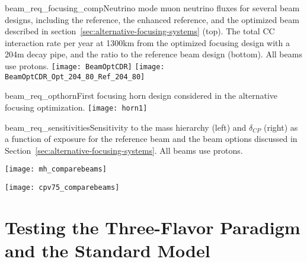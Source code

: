 \begin{cdrfigure}
{beam_req_focusing_comp}{Neutrino mode muon 
    neutrino fluxes for several beam designs, including the 
    reference, the enhanced reference, and the optimized beam
    described in section~\ref{sec:alternative-focusing-systems} (top). The total CC interaction rate per year at 1300km from the optimized focusing design with a 204m decay pipe, and the ratio to the reference beam design (bottom).  
    All beams use  protons.}
  \texttt{[image: BeamOptCDR]}
  \texttt{[image: BeamOptCDR\_Opt\_204\_80\_Ref\_204\_80]}
\end{cdrfigure}

\begin{cdrfigure}{beam_req_opthorn}{First focusing horn design considered 
    in the alternative focusing optimization. 
}
  \texttt{[image: horn1]}
\end{cdrfigure}

\begin{cdrfigure}
{beam_req_sensitivities}{Sensitivity to the mass hierarchy (left) and
  $\delta_{CP}$ (right) as a function of exposure for the reference beam and
  the beam options discussed in
  Section~\ref{sec:alternative-focusing-systems}.  All beams use  protons.}

\centering 
\begin{minipage}{0.5\textwidth}
\centering 
\texttt{[image: mh\_comparebeams]}
\end{minipage}\hfill 
\begin{minipage}{0.5\textwidth}
\centering 
\texttt{[image: cpv75\_comparebeams]}
\end{minipage} 
\end{cdrfigure}

\section{Testing the Three-Flavor Paradigm and the Standard Model}
\label{sec:physics-lbnosc-3nutests}

